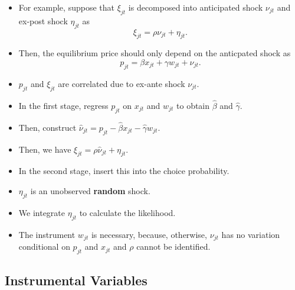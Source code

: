 \documentclass[
]{book}
\providecommand{\tightlist}{%
  \setlength{\itemsep}{0pt}\setlength{\parskip}{0pt}}
\begin{document}
\begin{itemize}
\tightlist
\item
  For example, suppose that \(\xi_{jt}\) is decomposed into anticipated shock \(\nu_{jt}\) and ex-post shock \(\eta_{jt}\) as
  \begin{equation}
  \xi_{jt} = \rho \nu_{jt} + \eta_{jt}.
  \end{equation}
\item
  Then, the equilibrium price should only depend on the anticpated shock as
  \begin{equation}
  p_{jt} = \beta x_{jt} + \gamma w_{jt} + \nu_{jt}.
  \end{equation}
\item
  \(p_{jt}\) and \(\xi_{jt}\) are correlated due to ex-ante shock \(\nu_{jt}\).
\item
  In the first stage, regress \(p_{jt}\) on \(x_{jt}\) and \(w_{jt}\) to obtain \(\hat{\beta}\) and \(\hat{\gamma}\).
\item
  Then, construct \(\hat{\nu}_{jt} = p_{jt} - \hat{\beta} x_{jt} - \hat{\gamma} w_{jt}\).
\item
  Then, we have \(\xi_{jt} = \rho \hat{\nu}_{jt} + \eta_{jt}\).
\item
  In the second stage, insert this into the choice probability.
\item
  \(\eta_{jt}\) is an unobserved \textbf{random} shock.
\item
  We integrate \(\eta_{jt}\) to calculate the likelihood.
\item
  The instrument \(w_{jt}\) is necessary, because, otherwise, \(\nu_{jt}\) has no variation conditional on \(p_{jt}\) and \(x_{jt}\) and \(\rho\) cannot be identified.
\end{itemize}

\hypertarget{instrumental-variables}{%
\subsection{Instrumental Variables}\label{instrumental-variables}}
\end{document}
